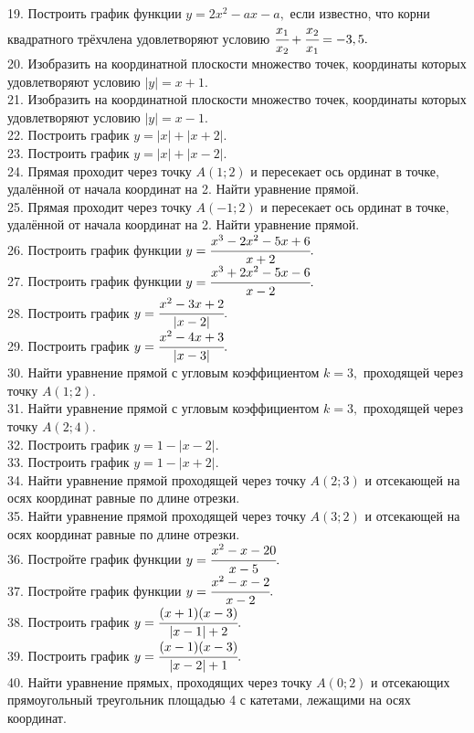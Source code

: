 \documentclass[12pt]{article}
\begin{document}
19. Построить график функции $y=2x^2-ax-a,$ если известно, что корни квадратного трёхчлена удовлетворяют условию $\cfrac{x_1}{x_2}+\cfrac{x_2}{x_1}=-3,5.$\\
20. Изобразить на координатной плоскости множество точек, координаты которых удовлетворяют условию $|y|=x+1.$\\
21. Изобразить на координатной плоскости множество точек, координаты которых удовлетворяют условию $|y|=x-1.$\\
22. Построить график $y=|x|+|x+2|.$\\
23. Построить график $y=|x|+|x-2|.$\\
24. Прямая проходит через точку $A(1;2)$ и пересекает ось ординат в точке, удалённой от начала координат на 2. Найти уравнение прямой.\\
25. Прямая проходит через точку $A(-1;2)$ и пересекает ось ординат в точке, удалённой от начала координат на 2. Найти уравнение прямой.\\
26. Построить график функции $y=\cfrac{x^3-2x^2-5x+6}{x+2}.$\\
27. Построить график функции $y=\cfrac{x^3+2x^2-5x-6}{x-2}.$\\
28. Построить график $y=\cfrac{x^2-3x+2}{|x-2|}.$\\
29. Построить график $y=\cfrac{x^2-4x+3}{|x-3|}.$\\
30. Найти уравнение прямой с угловым коэффициентом $k=3,$ проходящей через точку $A(1;2).$\\
31. Найти уравнение прямой с угловым коэффициентом $k=3,$ проходящей через точку $A(2;4).$\\
32. Построить график $y=1-|x-2|.$\\
33. Построить график $y=1-|x+2|.$\\
34. Найти уравнение прямой проходящей через точку $A(2;3)$ и отсекающей на осях координат равные по длине отрезки.\\
35. Найти уравнение прямой проходящей через точку $A(3;2)$ и отсекающей на осях координат равные по длине отрезки.\\
36. Постройте график функции $y=\cfrac{x^2-x-20}{x-5}.$\\
37. Постройте график функции $y=\cfrac{x^2-x-2}{x-2}.$\\
38. Построить график $y=\cfrac{(x+1)(x-3)}{|x-1|+2}.$\\
39. Построить график $y=\cfrac{(x-1)(x-3)}{|x-2|+1}.$\\
40. Найти уравнение прямых, проходящих через точку $A(0;2)$ и отсекающих прямоугольный треугольник площадью 4 с катетами, лежащими на осях координат.\\
\end{document}
